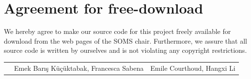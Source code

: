 \documentclass[11pt]{article}
\begin{document}

\newpage


\newpage
\section*{Agreement for free-download}
\bigskip


\bigskip


\large We hereby agree to make our source code for this project freely available for download from the web pages of the SOMS chair. Furthermore, we assure that all source code is written by ourselves and is not violating any copyright restrictions.

\begin{center}

\bigskip


\bigskip


\begin{tabular}{@{}p{1cm}@{}p{8cm}@{}@{}p{8cm}@{}}
\begin{minipage}{1cm}

\end{minipage}
&
\begin{minipage}{6cm}
\vspace{2mm} \large Emek Barış Küçüktabak, Francesca Sabena

 \vspace{\baselineskip}

\end{minipage}
&
\begin{minipage}{4cm}

\large Emile Courthoud, Hangxi Li

\end{minipage}
\end{tabular}


\end{center}
\newpage







\tableofcontents

\newpage
\end{document}
